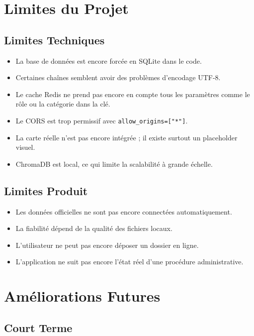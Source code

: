 \documentclass[12pt,a4paper]{report}
\begin{document}
\chapter{Limites du Projet}

\section{Limites Techniques}

\begin{itemize}
    \item La base de données est encore forcée en SQLite dans le code.
    \item Certaines chaînes semblent avoir des problèmes d'encodage UTF-8.
    \item Le cache Redis ne prend pas encore en compte tous les paramètres comme le rôle ou la catégorie dans la clé.
    \item Le CORS est trop permissif avec \texttt{allow\_origins=["*"]}.
    \item La carte réelle n'est pas encore intégrée ; il existe surtout un placeholder visuel.
    \item ChromaDB est local, ce qui limite la scalabilité à grande échelle.
\end{itemize}

\section{Limites Produit}

\begin{itemize}
    \item Les données officielles ne sont pas encore connectées automatiquement.
    \item La fiabilité dépend de la qualité des fichiers locaux.
    \item L'utilisateur ne peut pas encore déposer un dossier en ligne.
    \item L'application ne suit pas encore l'état réel d'une procédure administrative.
\end{itemize}


\chapter{Améliorations Futures}

\section{Court Terme}
\end{document}
